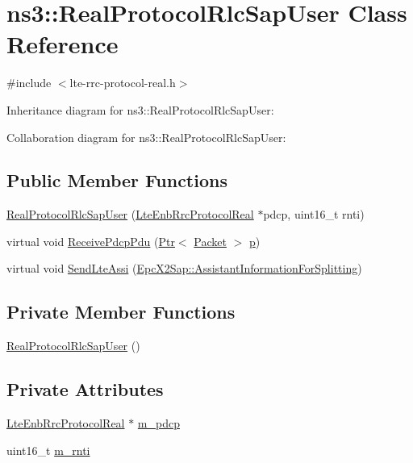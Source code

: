 \hypertarget{classns3_1_1RealProtocolRlcSapUser}{}\section{ns3\+:\+:Real\+Protocol\+Rlc\+Sap\+User Class Reference}
\label{classns3_1_1RealProtocolRlcSapUser}


{\ttfamily \#include $<$lte-\/rrc-\/protocol-\/real.\+h$>$}



Inheritance diagram for ns3\+:\+:Real\+Protocol\+Rlc\+Sap\+User\+:


Collaboration diagram for ns3\+:\+:Real\+Protocol\+Rlc\+Sap\+User\+:
\subsection*{Public Member Functions}
\begin{DoxyCompactItemize}
\item 
\hyperlink{classns3_1_1RealProtocolRlcSapUser_a1d2d45998c6e90a91acbf76a81911ad9}{Real\+Protocol\+Rlc\+Sap\+User} (\hyperlink{classns3_1_1LteEnbRrcProtocolReal}{Lte\+Enb\+Rrc\+Protocol\+Real} $\ast$pdcp, uint16\+\_\+t rnti)
\item 
virtual void \hyperlink{classns3_1_1RealProtocolRlcSapUser_a454cada9f46fad9665ceb472f5e67c89}{Receive\+Pdcp\+Pdu} (\hyperlink{classns3_1_1Ptr}{Ptr}$<$ \hyperlink{classns3_1_1Packet}{Packet} $>$ \hyperlink{lte__link__budget__x2__handover__measures_8m_ac9de518908a968428863f829398a4e62}{p})
\item 
virtual void \hyperlink{classns3_1_1RealProtocolRlcSapUser_acfc478ba01b9c759792a84712c9d962b}{Send\+Lte\+Assi} (\hyperlink{structns3_1_1EpcX2Sap_1_1AssistantInformationForSplitting}{Epc\+X2\+Sap\+::\+Assistant\+Information\+For\+Splitting})
\end{DoxyCompactItemize}
\subsection*{Private Member Functions}
\begin{DoxyCompactItemize}
\item 
\hyperlink{classns3_1_1RealProtocolRlcSapUser_ae74be4ca07ecb86d76c5f308f6fcfca4}{Real\+Protocol\+Rlc\+Sap\+User} ()
\end{DoxyCompactItemize}
\subsection*{Private Attributes}
\begin{DoxyCompactItemize}
\item 
\hyperlink{classns3_1_1LteEnbRrcProtocolReal}{Lte\+Enb\+Rrc\+Protocol\+Real} $\ast$ \hyperlink{classns3_1_1RealProtocolRlcSapUser_a8de27114cb3915ab625268ddec589b65}{m\+\_\+pdcp}
\item 
uint16\+\_\+t \hyperlink{classns3_1_1RealProtocolRlcSapUser_a16544cd6ab3a77750bededc345624f95}{m\+\_\+rnti}
\end{DoxyCompactItemize}
